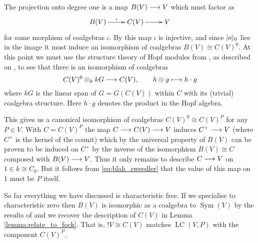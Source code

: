 \documentclass[english,letter paper,12pt,reqno]{article}
\DeclarePairedDelimiter\ket{\lvert}{\rangle}
\theoremstyle{example}
\numberwithin{equation}{section}
\DeclareMathOperator{\Sym}{Sym}
\DeclareMathOperator{\LC}{LC}
\begin{document}
The projection onto degree one is a map $B(V) \longrightarrow V$ which must factor as
\[
\xymatrix{
B(V) \ar[r]^-{\iota} & C(V) \ar[r] & V
}
\]
for some morphism of coalgebras $\iota$. By \cite[Theorem 12.2.6]{sweedler} this map $\iota$ is injective, and since $\ket{o}_0$ lies in the image it must induce an isomorphism of coalgebras $B(V) \cong C(V)^0$. At this point we must use the structure theory of Hopf modules from \cite[Chapter 4]{sweedler}, as described on \cite[p.175]{sweedler}, to see that there is an isomorphism of coalgebras
\[
C(V)^0 \otimes_k kG \longrightarrow C(V), \qquad h \otimes g \longmapsto h \cdot g
\]
where $kG$ is the linear span of $G = G(C(V))$ within $C$ with its (trivial) coalgebra structure. Here $h \cdot g$ denotes the product in the Hopf algebra. 

This gives us a canonical isomorphism of coalgebras $C(V)^0 \cong C(V)^P$ for any $P \in V$. With $C = C(V)^P$ the map $C \longrightarrow C(V) \longrightarrow V$ induces $C^+ \longrightarrow V$ (where $C^+$ is the kernel of the counit) which by the universal property of $B(V)$ \cite[Theorem 12.2.5]{sweedler} can be proven to be induced on $C^+$ by the inverse of the isomorphism $B(V) \cong C$ composed with $B(V) \longrightarrow V$. Thus it only remains to describe $C \longrightarrow V$ on $1 \in k \cong C_0$. But it follows from \eqref{eq:blah_sweedler} that the value of this map on $1$ must be $P$ itself.

So far everything we have discussed is characteristic free. If we specialise to characteristic zero then $B(V)$ is isomorphic as a coalgebra to $\Sym(V)$ by the results of \cite[Chapter 12]{sweedler} and we recover the description of $C(V)$ in Lemma \ref{lemma:relate_to_fock}. That is, ${!} V \cong C(V)$ matches $\LC(V,P)$ with the component $C(V)^P$. %
\end{document}
